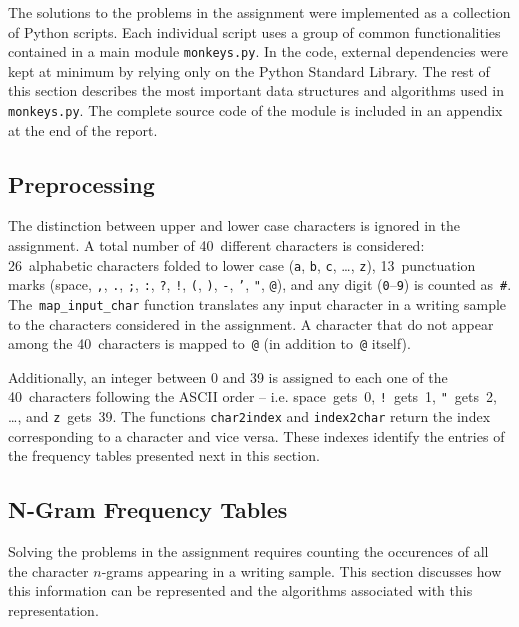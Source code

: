 \documentclass[conference]{IEEEtran}
\newcommand{\codeinline}[1]{{\fontsize{8}{0}\selectfont\texttt{#1}}}
\begin{document}
The solutions to the problems in the assignment were implemented as a collection of Python scripts.
Each individual script uses a group of common functionalities contained in a main module \codeinline{monkeys.py}.
In the code, external dependencies were kept at minimum by relying only on the Python Standard Library.
The rest of this section describes the most important data structures and algorithms used in \codeinline{monkeys.py}.
The complete source code of the module is included in an appendix at the end of the report.


\subsection{Preprocessing}

The distinction between upper and lower case characters is ignored in the assignment.
A total number of 40~different characters is considered: 
26~alphabetic characters folded to lower case (\codeinline{a}, \codeinline{b}, \codeinline{c}, \ldots, \codeinline{z}), 
13~punctuation marks (space, \codeinline{,}, \codeinline{.}, \codeinline{;}, \codeinline{:}, \codeinline{?}, \codeinline{!}, \codeinline{(}, \codeinline{)}, \codeinline{-}, \codeinline{'}, \codeinline{"}, \codeinline{@}),
and any digit (\codeinline{0}--\codeinline{9}) is counted as~\codeinline{\#}.
The~\codeinline{map\_input\_char} function translates any input character in a writing sample to the characters considered in the assignment.
A character that do not appear among the 40~characters is mapped to~\codeinline{@} (in addition to~\codeinline{@} itself).

Additionally, an integer between 0 and 39 is assigned to each one of the 40~characters following the ASCII order
-- i.e. space~gets~0, \codeinline{!}~gets~1, \codeinline{"}~gets~2, \ldots, and \codeinline{z}~gets~39.
The functions \codeinline{char2index} and \codeinline{index2char} return the index corresponding to a character and vice versa.
These indexes identify the entries of the frequency tables presented next in this section.


\subsection{N-Gram Frequency Tables}

Solving the problems in the assignment requires counting the occurences of all the character \mbox{\mbox{$n$-gram}s} appearing in a writing sample.
This section discusses how this information can be represented and the algorithms associated with this representation.
\end{document}
